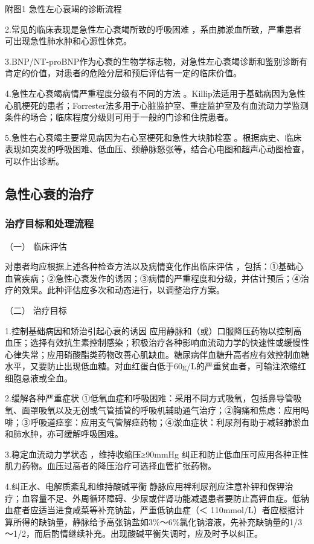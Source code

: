 附图1 急性左心衰竭的诊断流程

2.常见的临床表现是急性左心衰竭所致的呼吸困难
，系由肺淤血所致，严重患者可出现急性肺水肿和心源性休克。

3.BNP/NT-proBNP作为心衰的生物学标志物，对急性左心衰竭诊断和鉴别诊断有肯定的价值，对患者的危险分层和预后评估有一定的临床价值。

4.急性左心衰竭病情严重程度分级有不同的方法
。Killip法适用于基础病因为急性心肌梗死的患者；Forrester法多用于心脏监护室、重症监护室及有血流动力学监测条件的场合；临床程度分级则可用于一般的门诊和住院患者。

5.急性右心衰竭主要常见病因为右心室梗死和急性大块肺栓塞
。根据病史、临床表现如突发的呼吸困难、低血压、颈静脉怒张等，结合心电图和超声心动图检查，可以作出诊断。

\subsection{急性心衰的治疗}

\subsubsection{治疗目标和处理流程}

\hypertarget{text00071.htmlux5cux23CHP3-2-5-5-1-1}{}
（一） 临床评估

对患者均应根据上述各种检查方法以及病情变化作出临床评估
，包括：①基础心血管疾病；②急性心衰发作的诱因；③病情的严重程度和分级，并估计预后；④治疗的效果。此种评估应多次和动态进行，以调整治疗方案。

\hypertarget{text00071.htmlux5cux23CHP3-2-5-5-1-2}{}
（二） 治疗目标

1.控制基础病因和矫治引起心衰的诱因
应用静脉和（或）口服降压药物以控制高血压；选择有效抗生素控制感染；积极治疗各种影响血流动力学的快速性或缓慢性心律失常；应用硝酸酯类药物改善心肌缺血。糖尿病伴血糖升高者应有效控制血糖水平，又要防止出现低血糖。对血红蛋白低于60g/L的严重贫血者，可输注浓缩红细胞悬液或全血。

2.缓解各种严重症状
①低氧血症和呼吸困难：采用不同方式吸氧，包括鼻导管吸氧、面罩吸氧以及无创或气管插管的呼吸机辅助通气治疗；②胸痛和焦虑：应用吗啡；③呼吸道痉挛：应用支气管解痉药物；④淤血症状：利尿剂有助于减轻肺淤血和肺水肿，亦可缓解呼吸困难。

3.稳定血流动力学状态 ，维持收缩压≥90mmHg
纠正和防止低血压可应用各种正性肌力药物。血压过高者的降压治疗可选择血管扩张药物。

4.纠正水、电解质紊乱和维持酸碱平衡
静脉应用袢利尿剂应注意补钾和保钾治疗；血容量不足、外周循环障碍、少尿或伴肾功能减退患者要防止高钾血症。低钠血症者应适当进食咸菜等补充钠盐，严重低钠血症（＜
110mmol/L）者应根据计算所得的缺钠量，静脉给予高张钠盐如3\%～6\%氯化钠溶液，先补充缺钠量的1/3～1/2，而后酌情继续补充。出现酸碱平衡失调时，应及时予以纠正。

